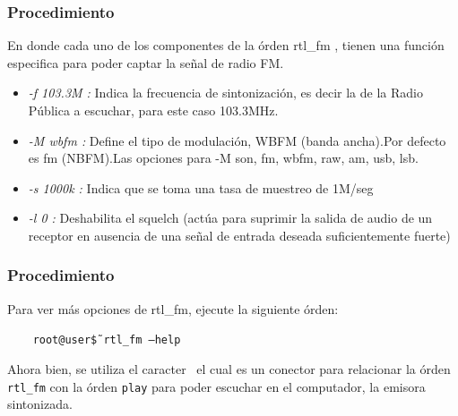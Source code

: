 \begin{frame}
\frametitle{Procedimiento}

En donde cada uno de los componentes de la órden rtl\_fm , tienen una función especifica para poder captar la señal de radio FM.

\begin{itemize}
    \item {\textit{-f 103.3M : } Indica la frecuencia de sintonización, es decir la de la Radio Pública a escuchar, para este caso 103.3MHz.}
    \item {\textit{-M wbfm :} Define el tipo de modulación, WBFM (banda ancha).Por defecto es fm (NBFM).Las opciones para -M son, fm, wbfm, raw, am, usb, lsb.}
    \item {\textit{-s 1000k :} Indica que se toma una tasa de muestreo de 1M/seg}
    \item {\textit{-l 0 :} Deshabilita el squelch (actúa para suprimir la salida de audio de un receptor en ausencia de una señal de entrada deseada suficientemente fuerte)}
\end{itemize}

\end{frame}

\begin{frame}
\frametitle{Procedimiento}

Para ver más opciones de rtl\_fm, ejecute la siguiente órden:

\begin{block}{}
  \texttt{
  \ \ \ root@user\~\$ rtl\_fm --help}
\end{block} 

Ahora bien, se utiliza el caracter \textbar  \ el cual es un conector para relacionar la órden \texttt{rtl\_fm} con la órden \texttt{play} para poder escuchar en el computador, la emisora sintonizada.


\end{frame}

